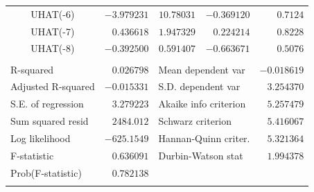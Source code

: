 \documentclass[12pt]{report}
\begin{document}
\begin{table}[H]
\begin{tabular}{lrrrr}
		\multicolumn{1}{c}{UHAT(-6)}&\multicolumn{1}{r}{$-3.979231$}&\multicolumn{1}{r}{$10.78031$}&\multicolumn{1}{r}{$-0.369120$}&\multicolumn{1}{r}{$0.7124$}\\
		\multicolumn{1}{c}{UHAT(-7)}&\multicolumn{1}{r}{$0.436618$}&\multicolumn{1}{r}{$1.947329$}&\multicolumn{1}{r}{$0.224214$}&\multicolumn{1}{r}{$0.8228$}\\
		\multicolumn{1}{c}{UHAT(-8)}&\multicolumn{1}{r}{$-0.392500$}&\multicolumn{1}{r}{$0.591407$}&\multicolumn{1}{r}{$-0.663671$}&\multicolumn{1}{r}{$0.5076$}\\
		[4.5pt] \hline \\ [-4.5pt]
		\multicolumn{1}{l}{R-squared}&\multicolumn{1}{r}{$0.026798$}&\multicolumn{2}{l}{Mean dependent var}&\multicolumn{1}{r}{$-0.018619$}\\
		\multicolumn{1}{l}{Adjusted R-squared}&\multicolumn{1}{r}{$-0.015331$}&\multicolumn{2}{l}{S.D. dependent var}&\multicolumn{1}{r}{$3.254370$}\\
		\multicolumn{1}{l}{S.E. of regression}&\multicolumn{1}{r}{$3.279223$}&\multicolumn{2}{l}{Akaike info criterion}&\multicolumn{1}{r}{$5.257479$}\\
		\multicolumn{1}{l}{Sum squared resid}&\multicolumn{1}{r}{$2484.012$}&\multicolumn{2}{l}{Schwarz criterion}&\multicolumn{1}{r}{$5.416067$}\\
		\multicolumn{1}{l}{Log likelihood}&\multicolumn{1}{r}{$-625.1549$}&\multicolumn{2}{l}{Hannan-Quinn criter.}&\multicolumn{1}{r}{$5.321364$}\\
		\multicolumn{1}{l}{F-statistic}&\multicolumn{1}{r}{$0.636091$}&\multicolumn{2}{l}{Durbin-Watson stat}&\multicolumn{1}{r}{$1.994378$}\\
		\multicolumn{1}{l}{Prob(F-statistic)}&\multicolumn{1}{r}{$0.782138$}&\multicolumn{1}{c}{}&\multicolumn{1}{c}{}&\multicolumn{1}{c}{}\\
		[4.5pt] \hline \\ [-4.5pt]
	\end{tabular}
\end{table}
\end{document}
